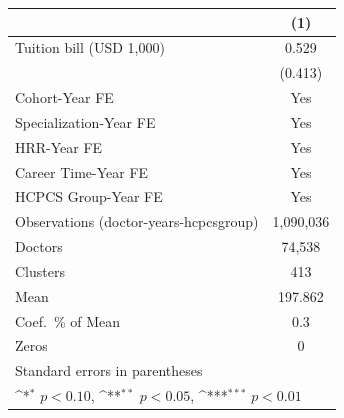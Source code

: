 {
\def\sym#1{\ifmmode^{#1}\else\(^{#1}\)\fi}
\begin{tabular}{l*{1}{c}}
\hline\hline
                    &\multicolumn{1}{c}{(1)}         \\
\hline
Tuition bill (USD 1,000)&       0.529         \\
                    &     (0.413)         \\
[1em]
Cohort-Year FE      &         Yes         \\
[1em]
Specialization-Year FE&         Yes         \\
[1em]
HRR-Year FE         &         Yes         \\
[1em]
Career Time-Year FE &         Yes         \\
[1em]
HCPCS Group-Year FE &         Yes         \\
\hline
Observations (doctor-years-hcpcsgroup)&   1,090,036         \\
Doctors             &      74,538         \\
Clusters            &         413         \\
Mean                &     197.862         \\
Coef.\ \% of Mean   &         0.3         \\
Zeros               &           0         \\
\hline\hline
\multicolumn{2}{l}{\footnotesize Standard errors in parentheses}\\
\multicolumn{2}{l}{\footnotesize \sym{*} \(p<0.10\), \sym{**} \(p<0.05\), \sym{***} \(p<0.01\)}\\
\end{tabular}
}
